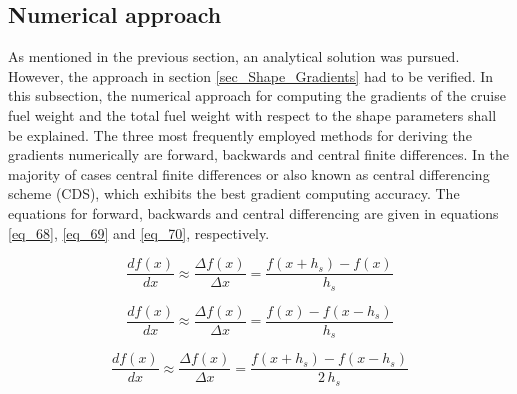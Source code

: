 \FloatBarrier
\subsection{Numerical approach}
\label{subsec_CDS}

As mentioned in the previous section, an analytical 
solution was pursued. However, the approach 
in section \ref{sec_Shape_Gradients} 
had to be verified. In this subsection, 
the numerical approach for computing the gradients 
of the cruise fuel weight and the total fuel weight 
with respect to the shape parameters shall be 
explained. The three most frequently 
employed methods for 
deriving the gradients numerically are 
forward, backwards and central finite 
differences. In the majority of cases 
central finite differences or also known 
as central differencing scheme (CDS), which exhibits 
the best gradient computing accuracy. The equations 
for forward, backwards and central differencing 
are given in equations \eqref{eq_68}, \eqref{eq_69}
and \eqref{eq_70}, respectively. 

\begin{equation}
    \label{eq_68}
    \frac{df(x)}{dx} \approx \frac{\Delta f(x)}{\Delta x}=
     \frac{f(x+h_s) - f(x)}{h_s}
\end{equation}

\begin{equation}
    \label{eq_69}
    \frac{df(x)}{dx} \approx \frac{\Delta f(x)}{\Delta x}=
     \frac{f(x) - f(x-h_s)}{h_s}
\end{equation}

\begin{equation}
    \label{eq_70}
    \frac{df(x)}{dx} \approx \frac{\Delta f(x)}{\Delta x}=
     \frac{f(x+h_s) - f(x -h_s)}{2\, h_s}
\end{equation}

